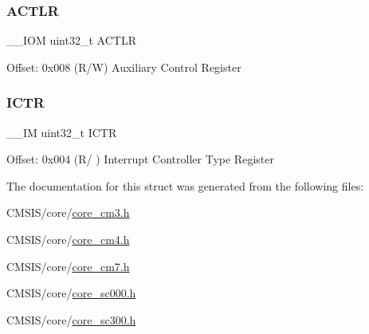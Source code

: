\subsubsection{\texorpdfstring{A\+C\+T\+LR}{ACTLR}}
{\footnotesize\ttfamily \+\_\+\+\_\+\+I\+OM uint32\+\_\+t A\+C\+T\+LR}

Offset\+: 0x008 (R/W) Auxiliary Control Register \mbox{\label{struct_s_cn_s_c_b___type_acf9b76331abd768af25a10b3625da4b4}} 
\subsubsection{\texorpdfstring{I\+C\+TR}{ICTR}}
{\footnotesize\ttfamily \+\_\+\+\_\+\+IM uint32\+\_\+t I\+C\+TR}

Offset\+: 0x004 (R/ ) Interrupt Controller Type Register 

The documentation for this struct was generated from the following files\+:\begin{DoxyCompactItemize}
\item 
C\+M\+S\+I\+S/core/\hyperlink{core__cm3_8h}{core\+\_\+cm3.\+h}\item 
C\+M\+S\+I\+S/core/\hyperlink{core__cm4_8h}{core\+\_\+cm4.\+h}\item 
C\+M\+S\+I\+S/core/\hyperlink{core__cm7_8h}{core\+\_\+cm7.\+h}\item 
C\+M\+S\+I\+S/core/\hyperlink{core__sc000_8h}{core\+\_\+sc000.\+h}\item 
C\+M\+S\+I\+S/core/\hyperlink{core__sc300_8h}{core\+\_\+sc300.\+h}\end{DoxyCompactItemize}
